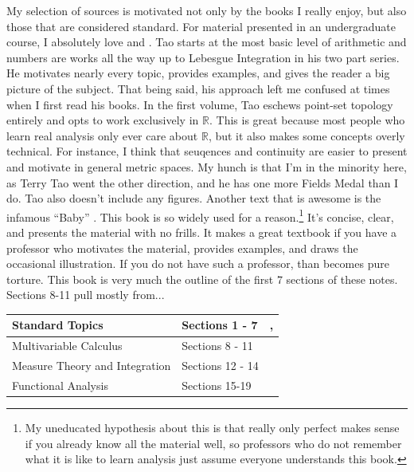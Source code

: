\documentclass{article}
\newcommand{\R}{\mathbb{R}}
\theoremstyle{definition}
\begin{document}
	
	My selection of sources is motivated not only by the books I really enjoy, but also those that are considered standard. For material presented in an undergraduate course, I absolutely love \cite{tao2006analysis} and \cite{tao2009analysis}. Tao starts at the most basic level of arithmetic and numbers are works all the way up to Lebesgue Integration in his two part series. He motivates nearly every topic, provides examples, and gives the reader a big picture of the subject. That being said, his approach left me confused at times when I first read his books. In the first volume, Tao eschews point-set topology entirely and opts to work exclusively in $ \R $. This is great because most people who learn real analysis only ever care about $ \R $, but it also makes some concepts overly technical. For instance, I think that seuqences and continuity are easier to present and motivate in general metric spaces. My hunch is that I'm in the minority here, as Terry Tao went the other direction, and he has one more Fields Medal than I do. Tao also doesn't include any figures. Another text that is awesome is the infamous ``Baby'' \cite{rudin1964principles}. This book is so widely used for a reason.\footnote{My uneducated hypothesis about this is that \cite{rudin1964principles} really only perfect makes sense if you already know all the material well, so professors who do not remember what it is like to learn analysis just assume everyone understands this book.} It's concise, clear, and presents the material with no frills. It makes a great textbook if you have a professor who motivates the material, provides examples, and draws the occasional illustration. If you do not have such a professor, than \cite{rudin1964principles} becomes pure torture. This book is very much the outline of the first 7 sections of these notes. Sections 8-11 pull mostly from...
	

	\begin{table}[]
		\centering
		\begin{tabular}{|l|l|l|}
			\hline
			Standard Topics & Sections 1 - 7 &  \citet{tao2006analysis, tao2009analysis}, \cite{rudin}\\ \hline
			Multivariable Calculus & Sections 8 - 11 &  \\ \hline
			Measure Theory and Integration &  Sections 12 - 14&  \\ \hline
			Functional Analysis & Sections 15-19  &  \\ \hline
		\end{tabular}
	\end{table}
\end{document}
